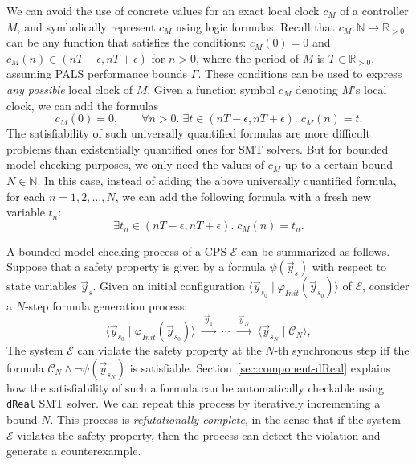 \documentclass{sig-alternate}
\begin{document}
We can avoid the use of concrete values for 
an exact local clock $c_M$ of a controller $M$,
and symbolically represent $c_M$ using logic formulas.
Recall that 
$c_M : \mathbb{N} \to \mathbb{R}_{>0}$ can be any function that satisfies
the conditions:
$c_M(0) = 0$ and  $c_M(n) \in (n T - \epsilon, n T + \epsilon)$ for $n > 0$,
where the period of $M$ is $T \in \mathbb{R}_{>0}$,
assuming PALS performance bounds $\Gamma$.
These conditions can be used to express 
\emph{any possible} local clock
of $M$. Given a function symbol $c_M$ denoting $M$'s local clock,
we can add the formulas
\[
c_M(0) = 0,
\qquad
\forall n > 0.\; \exists t \in (n T - \epsilon, nT + \epsilon).\; c_M(n) = t.
\]
The satisfiability of such universally quantified formulas are  
more difficult problems than existentially quantified ones for SMT solvers.
But for bounded model checking purposes, 
we only need the values of $c_M$ up to a certain bound $N \in \mathbb{N}$.
In this case, instead of adding the above universally quantified formula,
for each $n = 1, 2, \ldots, N$, 
we can add the following formula with a fresh new variable $t_n$:
\[
\exists t_n \in (n T - \epsilon, nT + \epsilon).\;c_M(n) = t_n.
\]

A bounded model checking process of a CPS $\mathcal{E}$
can be summarized as follows. Suppose that 
a safety property is given by a formula $\psi(\vec{y}_s)$ %
with respect to state variables $\vec{y}_s$. %
Given an initial configuration $\langle\vec{y}_{s_0} \mid \varphi_{\mathit{Init}}(\vec{y}_{s_0}) \rangle$ of $\mathcal{E}$,
consider a $N$-step formula generation process:
\[
\langle\vec{y}_{s_0} \mid \varphi_{\mathit{Init}}(\vec{y}_{s_0}) \rangle
\;\xrightarrow{\;\vec{y}_{1}\;}\;
\cdots
\;\xrightarrow{\;\vec{y}_{N}\;}\;
\langle\vec{y}_{s_N} \mid  \mathcal{C}_N\rangle,
\]
The system $\mathcal{E}$ can violate  the safety property at the $N$-th 
synchronous step 
iff the formula $\mathcal{C}_N \wedge \neg \psi(\vec{y}_{s_N})$
is satisfiable.
Section~\ref{sec:component-dReal}
explains how the satisfiability of such a formula
can be automatically checkable
using \texttt{dReal} SMT solver.
We can repeat this process by iteratively incrementing a bound $N$.
This process is \emph{refutationally complete},
in the sense that 
if the system $\mathcal{E}$ violates the safety property,
then  the process can detect the violation and generate a counterexample.
\end{document}
